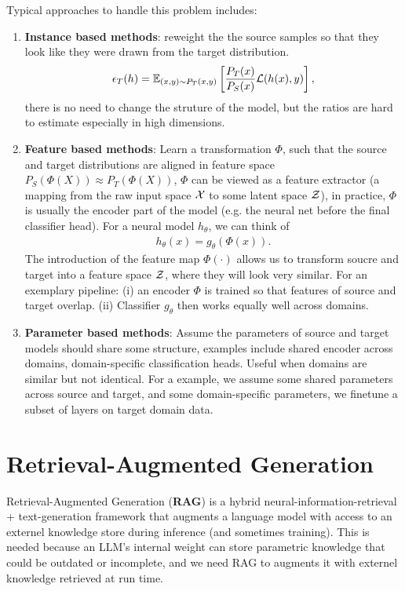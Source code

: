 \documentclass[11pt]{article}  %
\begin{document}
Typical approaches to handle this problem includes: 
\begin{enumerate}
  \item \textbf{Instance based methods}: reweight the the source samples so that they look like they were drawn from the target distribution.
  \begin{align*}
    \epsilon_T(h) = \mathbb{E}_{(x, y)\sim P_T(x, y)}\left[\frac{P_T(x)}{P_S(x)}\mathcal{L}(h(x), y)\right],
  \end{align*}
  there is no need to change the struture of the model, but the ratios are hard to estimate especially in high dimensions.

  \item \textbf{Feature based methods}: Learn a transformation $\Phi$, such that the source and target distributions are aligned in feature space $P_S(\Phi(X)) \approx P_T(\Phi(X))$, $\Phi$ can be viewed as a feature extractor (a mapping from the raw input space $\mathcal{X}$ to some latent space $\mathcal{Z}$), in practice, $\Phi$ is usually the encoder part of the model (e.g. the neural net before the final classifier head).
  For a neural model $h_\theta$, we can think of 
  \begin{align*}
    h_\theta(x) = g_\theta(\Phi(x)).
  \end{align*}
  The introduction of the feature map $\Phi(\cdot)$ allows us to transform soucre and target into a feature space $\mathcal{Z}$, where they will look very similar. 
  For an exemplary pipeline: (i) an encoder $\Phi$ is trained so that features of source and target overlap.
  (ii) Classifier $g_\theta$ then works equally well across domains.
  
  \item \textbf{Parameter based methods}: Assume the parameters of source and target models should share some structure, examples include shared encoder across domains, domain-specific classification heads.
  Useful when domains are similar but not identical. 
  For a example, we assume some shared parameters across source and target, and some domain-specific parameters, we finetune a subset of layers on target domain data.
\end{enumerate}



\section{Retrieval-Augmented Generation}

Retrieval-Augmented Generation (\textbf{RAG}) is a hybrid neural-information-retrieval + text-generation framework that augments a language model with access to an externel knowledge store during inference (and sometimes training).
This is needed because an LLM's internal weight can store parametric knowledge that could be outdated or incomplete, and we need RAG to augments it with externel knowledge retrieved at run time.
\end{document}
